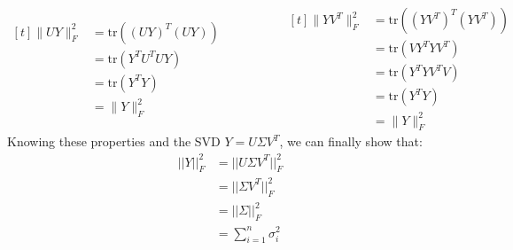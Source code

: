 \documentclass[a4paper]{scrartcl}
\begin{document}
\begin{equation*}
    \begin{aligned}[t]
        \|UY\|^2_F &= \text{tr}((UY)^T (UY)) \\
        &= \text{tr}(Y^T U^T U Y) \\
        &= \text{tr}(Y^T Y) \\
        &= \|Y\|_F^2
    \end{aligned}
    \hspace{2cm} %
    \begin{aligned}[t]
        \|YV^T\|^2_F &= \text{tr}((YV^T)^T (YV^T)) \\
        &= \text{tr}(V Y^T Y V^T) \\
        &= \text{tr}(Y^T Y V^T V) \\
        &= \text{tr}(Y^T Y) \\
        &= \|Y\|_F^2
    \end{aligned}
\end{equation*}
Knowing these properties and the SVD $Y = U \Sigma V^T$, we can finally show that:
\begin{align*}
    ||Y||_F^2 &= ||U \Sigma V^T ||_F^2\\
    &= ||\Sigma V^T||^2_F\\
    &= ||\Sigma||^2_F\\
    &= \sum_{i=1}^{n} \sigma_i^2
\end{align*}
\end{document}
